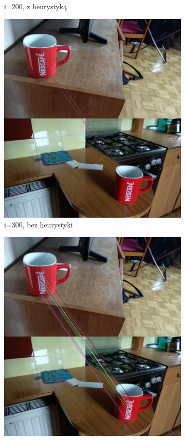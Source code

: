 \documentclass{article}
\begin{document}
\begin{figure}[H]
\begin{subfigure}[b]{0.35\linewidth}
			\caption{i=200, z heurystyką}
		\end{subfigure}
		\begin{subfigure}[b]{0.35\linewidth}
			\includegraphics[width=\linewidth]{300m1.png}
			\caption{i=300, bez heurystyki}
		\end{subfigure}
		\begin{subfigure}[b]{0.35\linewidth}
			\includegraphics[width=\linewidth]{300m2.png}

\end{subfigure}
\end{figure}
\end{document}
